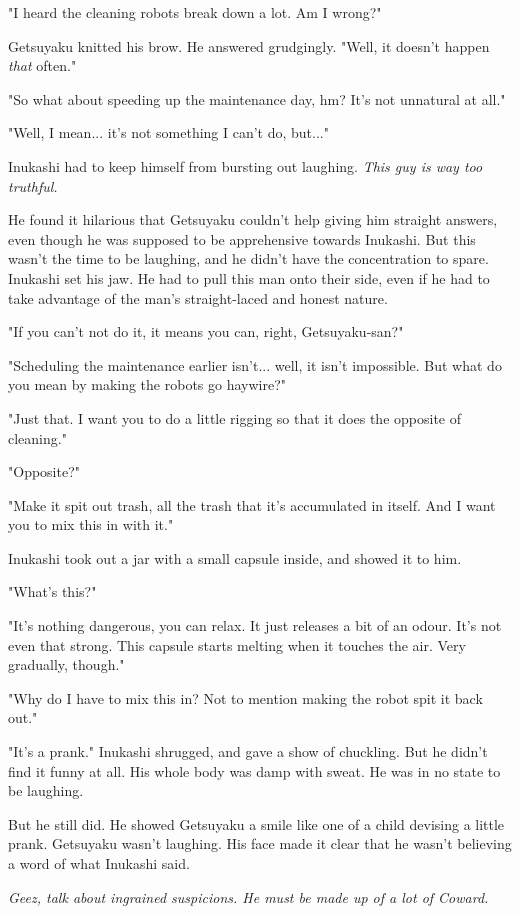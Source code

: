 "I heard the cleaning robots break down a lot. Am I wrong?"

Getsuyaku knitted his brow. He answered grudgingly. "Well, it doesn't
happen \emph{that} often."

"So what about speeding up the maintenance day, hm? It's not unnatural
at all."

"Well, I mean... it's not something I can't do, but..."

Inukashi had to keep himself from bursting out laughing. \emph{This guy is way
too truthful.}

He found it hilarious that Getsuyaku couldn't help giving him straight
answers, even though he was supposed to be apprehensive towards
Inukashi. But this wasn't the time to be laughing, and he didn't have
the concentration to spare. Inukashi set his jaw. He had to pull this
man onto their side, even if he had to take advantage of the man's
straight-laced and honest nature.

"If you can't not do it, it means you can, right, Getsuyaku-san?"

"Scheduling the maintenance earlier isn't... well, it isn't impossible.
But what do you mean by making the robots go haywire?"

"Just that. I want you to do a little rigging so that it does the
opposite of cleaning."

"Opposite?"

"Make it spit out trash, all the trash that it's accumulated in itself.
And I want you to mix this in with it."

Inukashi took out a jar with a small capsule inside, and showed it to
him.

"What's this?"

"It's nothing dangerous, you can relax. It just releases a bit of an
odour. It's not even that strong. This capsule starts melting when it
touches the air. Very gradually, though."

"Why do I have to mix this in? Not to mention making the robot spit it
back out."

"It's a prank." Inukashi shrugged, and gave a show of chuckling. But he
didn't find it funny at all. His whole body was damp with sweat. He was
in no state to be laughing.

But he still did. He showed Getsuyaku a smile like one of a child
devising a little prank. Getsuyaku wasn't laughing. His face made it
clear that he wasn't believing a word of what Inukashi said.

\emph{Geez, talk about ingrained suspicions. He must be made up of a lot of
Coward.}

